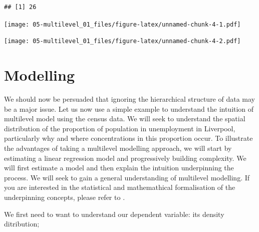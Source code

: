 \documentclass[]{book}
\newenvironment{Shaded}{\begin{snugshade}}{\end{snugshade}}
\newcommand{\KeywordTok}[1]{\textcolor[rgb]{0.13,0.29,0.53}{\textbf{#1}}}
\newcommand{\StringTok}[1]{\textcolor[rgb]{0.31,0.60,0.02}{#1}}
\newcommand{\CommentTok}[1]{\textcolor[rgb]{0.56,0.35,0.01}{\textit{#1}}}
\newcommand{\OperatorTok}[1]{\textcolor[rgb]{0.81,0.36,0.00}{\textbf{#1}}}
\newcommand{\NormalTok}[1]{#1}
\begin{document}
\begin{verbatim}
## [1] 26
\end{verbatim}

\begin{Shaded}
\end{Shaded}

\texttt{[image: 05-multilevel\_01\_files/figure-latex/unnamed-chunk-4-1.pdf]}

\begin{Shaded}
\end{Shaded}

\texttt{[image: 05-multilevel\_01\_files/figure-latex/unnamed-chunk-4-2.pdf]}

\section{Modelling}\label{modelling}

We should now be persuaded that ignoring the hierarchical structure of
data may be a major issue. Let us now use a simple example to understand
the intuition of multilevel model using the census data. We will seek to
understand the spatial distribution of the proportion of population in
unemployment in Liverpool, particularly why and where concentrations in
this proportion occur. To illustrate the advantages of taking a
multilevel modelling approach, we will start by estimating a linear
regression model and progressively building complexity. We will first
estimate a model and then explain the intuition underpinning the
process. We will seek to gain a general understanding of multilevel
modelling. If you are interested in the statistical and mathemathical
formalisation of the underpinning concepts, please refer to
\citet{Gelman_Hill_2006_book}.

We first need to want to understand our dependent variable: its density
ditribution;
\end{document}
